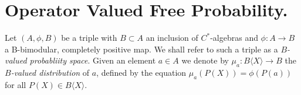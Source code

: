 \documentclass[11pt]{amsart}
\newtheorem{lemma}[theorem]{Lemma}
\newtheorem{corollary}[theorem]{Corollary}
\begin{document}
\section{Operator Valued Free Probability.}

Let $(A,\phi,B)$ be a triple with $B \subset A$ an inclusion of  $C^{\ast}$-algebras and $\phi: A \rightarrow B$ a B-bimodular, completely positive map.  
We shall refer to such a triple as
a \textit{$B$-valued probabliity space}.  Given an element $a \in A$ we denote by $\mu_{a}: B\langle X \rangle \rightarrow B$
 the \textit{$B$-valued distribution} of $a$, defined by the equation $\mu_{a}(P(X)) = \phi(P(a))$ for all $P(X) \in B\langle X \rangle$.  

\end{document}
